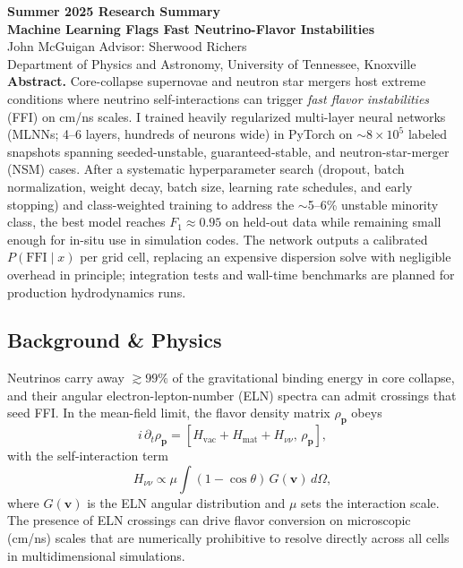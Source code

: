 \documentclass[10pt]{article}
\begin{document}
\begin{center}
{\Large \textbf{Summer 2025 Research Summary}}\\[2pt]
{\large \textbf{Machine Learning Flags Fast Neutrino-Flavor Instabilities}}\\[4pt]
John McGuigan \quad Advisor: Sherwood Richers\\
Department of Physics and Astronomy, University of Tennessee, Knoxville\\

\textbf{Abstract.}
Core-collapse supernovae and neutron star mergers host extreme conditions where neutrino self-interactions can trigger \emph{fast flavor instabilities} (FFI) on cm/ns scales.
I trained heavily regularized multi-layer neural networks (MLNNs; 4--6 layers, hundreds of neurons wide) in PyTorch on $\sim 8\times 10^5$ labeled snapshots spanning seeded-unstable, guaranteed-stable, and neutron-star-merger (NSM) cases.
After a systematic hyperparameter search (dropout, batch normalization, weight decay, batch size, learning rate schedules, and early stopping) and class-weighted training to address the $\sim$5--6\% unstable minority class, the best model reaches $F_1 \approx 0.95$ on held-out data while remaining small enough for in-situ use in simulation codes.
The network outputs a calibrated $P(\mathrm{FFI}\mid x)$ per grid cell, replacing an expensive dispersion solve with negligible overhead in principle; integration tests and wall-time benchmarks are planned for production hydrodynamics runs.

\subsection*{Background \& Physics}
Neutrinos carry away $\gtrsim 99\%$ of the gravitational binding energy in core collapse, and their angular electron-lepton-number (ELN) spectra can admit crossings that seed FFI.
In the mean-field limit, the flavor density matrix $\rho_{\mathbf{p}}$ obeys
\begin{equation*}
i\,\partial_t \rho_{\mathbf{p}} = \left[ H_{\mathrm{vac}} + H_{\mathrm{mat}} + H_{\nu\nu}, \, \rho_{\mathbf{p}} \right],
\end{equation*}
with the self-interaction term
\begin{equation*}
H_{\nu\nu} \propto \mu \!\int (1-\cos\theta)\, G(\mathbf{v})\, d\Omega,
\end{equation*}
where $G(\mathbf{v})$ is the ELN angular distribution and $\mu$ sets the interaction scale. The presence of ELN crossings can drive flavor conversion on microscopic (cm/ns) scales that are numerically prohibitive to resolve directly across all cells in multidimensional simulations.


\end{center}
\end{document}
